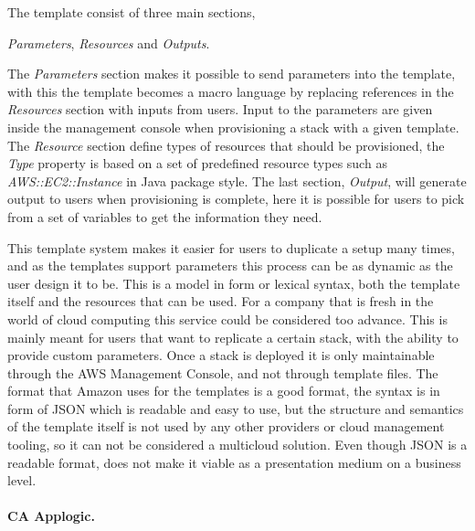 The template consist of three main sections, 
\begin{ii}\iitem \emph{Parameters}, \iitem \emph{Resources} and \iitem \emph{Outputs}.\end{ii}
The \emph{Parameters} section makes it possible to send parameters into the template, 
with this the template becomes a macro language by replacing 
references in the \emph{Resources} section with inputs from users. 
Input to the parameters are given inside the management console when 
provisioning a stack with a given template.
The \emph{Resource} section define types of resources that should be provisioned, the \emph{Type}
property is based on a set of predefined resource types such as \emph{AWS::EC2::Instance}
in Java package style.
The last section, \emph{Output}, will generate output to users when provisioning is complete,
here it is possible for users to pick from a set of variables to get the information they need.

This template system makes it easier for users to duplicate a setup many times, 
and as the templates support parameters this process can be as dynamic as the user design it to be. 
This is a model in form or lexical syntax, both the template itself 
and the resources that can be used.
For a company that is fresh in the world of cloud computing this service 
could be considered too advance. 
This is mainly meant for users that want to replicate a certain stack, 
with the ability to provide custom parameters. 
Once a stack is deployed it is only maintainable through the AWS Management Console, 
and not through template files. 
The format that Amazon uses for the templates is a good format, 
the syntax is in form of JSON which is readable and easy to use, 
but the structure and semantics of the template itself is not used by any 
other providers or cloud management tooling, 
so it can not be considered a multicloud solution. 
Even though JSON is a readable format, 
does not make it viable as a presentation medium on a business level.

\paragraph{CA Applogic.}~\cite{applogic}



